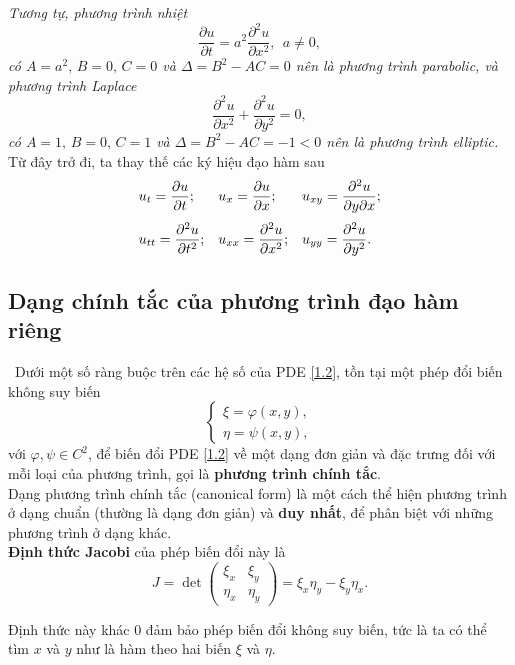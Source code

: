 \documentclass[10pt, a4paper]{article}
\begin{document}
	\textit{Tương tự, phương trình nhiệt $$\frac{\partial u}{\partial t}=a^2\frac{\partial^2u}{\partial x^2},~~a\ne0,$$ có $A=a^2,\,B=0,\,C=0$ và $\Delta=B^2-AC=0$ nên là phương trình parabolic, và phương trình Laplace} $$\frac{\partial^2u}{\partial x^2}+\frac{\partial^2u}{\partial y^2}=0,$$
	\textit{có $A=1,\,B=0,\,C=1$ và $\Delta=B^2-AC=-1<0$ nên là phương trình elliptic.}\\
	
	Từ đây trở đi, ta thay thế các ký hiệu đạo hàm sau $$\begin{array}{lll}
		u_t=\dfrac{\partial u}{\partial t};&u_x=\dfrac{\partial u}{\partial x};&u_{xy}=\dfrac{\partial^2u}{\partial y\partial x};\\
		\noalign{\vskip7pt}
		u_{tt}=\dfrac{\partial^2u}{\partial t^2};&u_{xx}=\dfrac{\partial^2u}{\partial x^2};&u_{yy}=\dfrac{\partial^2u}{\partial y^2}.
	\end{array}$$
	\subsection{Dạng chính tắc của phương trình đạo hàm riêng}
	\vspace{2mm}
	\quad\,\,\,Dưới một số ràng buộc trên các hệ số của PDE \eqref{1.2}, tồn tại một phép đổi biến không suy biến $$\begin{cases}
		\xi=\varphi(x,y),\\
		\eta=\psi(x,y),
	\end{cases}$$
	với $\varphi,\psi\in C^2$, để biến đổi PDE \eqref{1.2} về một dạng đơn giản và đặc trưng đối với mỗi loại của phương trình, gọi là \textbf{\color{red}phương trình chính tắc}.\\
	
	Dạng phương trình chính tắc (canonical form) là một cách thể hiện phương trình ở dạng chuẩn (thường là dạng đơn giản) và \textbf{duy nhất}, để phân biệt với những phương trình ở dạng khác.\\
	
	\textbf{\color{red}Định thức Jacobi} của phép biến đổi này là $$J=\det\begin{pmatrix}
		\xi_x&\xi_y\\
		\eta_x&\eta_y
	\end{pmatrix}=\xi_x\eta_y-\xi_y\eta_x.$$
	
	Định thức này khác 0 đảm bảo phép biến đổi không suy biến, tức là ta có thể tìm $x$ và $y$ như là hàm theo hai biến $\xi$ và $\eta$.\\
	
\end{document}
